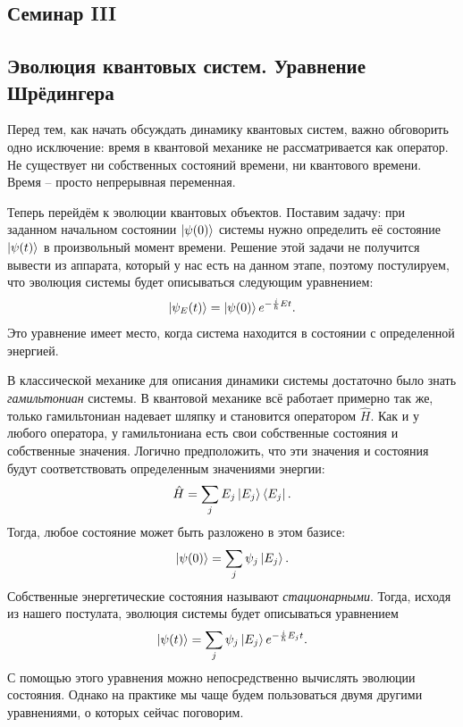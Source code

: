 \begin{center}
    \section{Семинар III}
\end{center}
\subsection{Эволюция квантовых систем. Уравнение Шрёдингера}
Перед тем, как начать обсуждать динамику квантовых систем, важно обговорить одно исключение: время в квантовой механике не рассматривается как оператор. Не существует ни собственных состояний времени, ни квантового времени. Время – просто непрерывная переменная.

Теперь перейдём к эволюции квантовых объектов. Поставим задачу: при заданном начальном состоянии $\ket{\psi(0)}$ системы нужно определить её состояние $\ket{\psi(t)}$ в произвольный момент времени. Решение этой задачи не получится вывести из аппарата, который у нас есть на данном этапе, поэтому постулируем, что эволюция системы будет описываться следующим уравнением:
\[
\ket{\psi_E(t)} = \ket{\psi(0)}e^{-\frac{i}{\hbar}Et}.
\]
Это уравнение имеет место, когда система находится в состоянии с определенной энергией.

В классической механике для описания динамики системы достаточно было знать \textit{гамильтониан} системы. В квантовой механике всё работает примерно так же, только гамильтониан надевает шляпку и становится оператором $\hat{H}$. Как и у любого оператора, у гамильтониана есть свои собственные состояния и собственные значения. Логично предположить, что эти значения и состояния будут соответствовать определенным значениями энергии:
\[
\hat{H} = \sum_j E_j\ket{E_j}\bra{E_j}.
\]
Тогда, любое состояние может быть разложено в этом базисе:
\[
\ket{\psi(0)} = \sum_j \psi_j\ket{E_j}.
\]
Собственные энергетические состояния называют \textit{стационарными}. Тогда, исходя из нашего постулата, эволюция системы будет описываться уравнением
\[
\ket{\psi(t)} = \sum_j \psi_j\ket{E_j}e^{-\frac{i}{\hbar}E_jt}.
\]
С помощью этого уравнения можно непосредственно вычислять эволюции состояния. Однако на практике мы чаще будем пользоваться двумя другими уравнениями, о которых сейчас поговорим.

